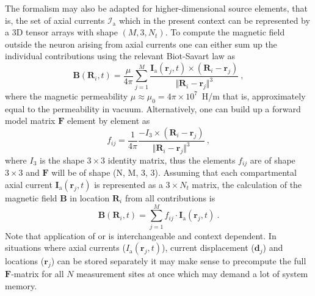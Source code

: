 The formalism may also be adapted for higher-dimensional source elements, that is, 
the set of axial currents $\mathcal{I}_\mathrm{a}$ which in the present context can be represented by a 3D tensor arrays with shape $(M, 3, N_t)$. 
To compute the magnetic field outside the neuron arising from axial currents one can 
either sum up the individual contributions using the relevant Biot-Savart law \cite{Blagoev2007,Hagen2018} as
%
\begin{equation}
\mathbf{B}(\mathbf{R}_i, t) = \frac{\mu}{4\pi} \sum_{j=1}^M \frac{\mathbf{I}_\mathrm{a}(\mathbf{r}_j, t) \times (\mathbf{R}_i - \mathbf{r}_j) }{\Vert \mathbf{R}_i - \mathbf{r}_j \Vert^3} ~,
\label{eq:LFPy_biotsavart1}
\end{equation}
%
where the magnetic permeability $\mu \approx \mu_0=4\pi\times 10^7$~\si{\henry/\metre} that is, approximately equal to the permeability in vacuum.  
Alternatively, 
one can build up a forward model matrix $\mathbf{F}$ element by element as
%
\begin{equation}
f_{ij} = \frac{1}{4\pi} \frac{-I_3 \times (\mathbf{R}_i - \mathbf{r}_j) }{\Vert \mathbf{R}_i - \mathbf{r}_j \Vert^3} ~, 
\label{eq:LFPy_biotsavart2}
\end{equation}
% 
where $I_3$ is the shape $3 \times 3$ identity matrix, 
thus the elements $f_{ij}$ are of shape $3 \times 3$ and $\mathbf{F}$ will be of shape (N, M, 3, 3).
Assuming that each compartmental axial current $\mathbf{I}_\mathrm{a}(\mathbf{r}_j, t)$ is represented as a $3 \times N_t$ matrix, 
the calculation of the magnetic field $\mathbf{B}$ in location $\mathbf{R}_i$ from all contributions is 
% 
\begin{equation}
\mathbf{B}(\mathbf{R}_i, t) = \sum_{j=1}^M f_{ij} \cdot \mathbf{I}_\mathrm{a}(\mathbf{r}_j, t) ~.
\label{eq:LFPy_biotsavart3}
\end{equation}
%
Note that application of  or  is interchangeable and context dependent. 
In situations where axial currents ($I_\mathrm{a}(\mathbf{r}_j, t)$), 
current displacement ($\mathbf{d}_j$) and locations ($\mathbf{r}_j$) can be stored separately it may make sense to precompute the full $\mathbf{F}$-matrix for all $N$ measurement sites at once which may demand a lot of system memory. 



